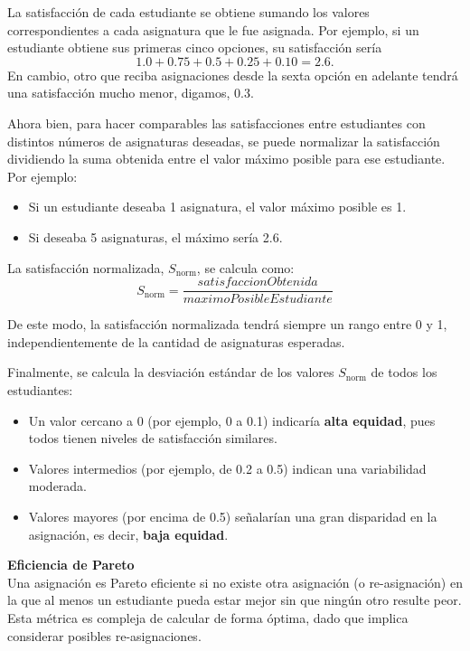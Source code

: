 \documentclass{article}
\begin{document}
La satisfacción de cada estudiante se obtiene sumando los valores correspondientes a cada 
asignatura que le fue asignada. Por ejemplo, si un estudiante obtiene sus primeras cinco opciones, 
su satisfacción sería
$$
1.0 + 0.75 + 0.5 + 0.25 + 0.10 = 2.6.
$$
En cambio, otro que reciba asignaciones desde la sexta opción en adelante tendrá una 
satisfacción mucho menor, digamos, 0.3.

Ahora bien, para hacer comparables las satisfacciones entre estudiantes con distintos números 
de asignaturas deseadas, se puede normalizar la satisfacción dividiendo la suma obtenida 
entre el valor máximo posible para ese estudiante. Por ejemplo:

\begin{itemize}
    \item Si un estudiante deseaba 1 asignatura, el valor máximo posible es 1.
    \item Si deseaba 5 asignaturas, el máximo sería 2.6.
\end{itemize}

La satisfacción normalizada, $S_{\mathrm{norm}}$, se calcula como:
$$
S_{\mathrm{norm}} = \frac{satisfaccionObtenida}{maximoPosibleEstudiante}
$$

De este modo, la satisfacción normalizada tendrá siempre un rango entre 0 y 1, independientemente de la cantidad de asignaturas esperadas.

Finalmente, se calcula la desviación estándar de los valores $S_{\mathrm{norm}}$ de todos los estudiantes:
\begin{itemize}
    \item Un valor cercano a 0 (por ejemplo, 0 a 0.1) indicaría \textbf{alta equidad}, pues todos tienen niveles de satisfacción similares.
    \item Valores intermedios (por ejemplo, de 0.2 a 0.5) indican una variabilidad moderada.
    \item Valores mayores (por encima de 0.5) señalarían una gran disparidad en la asignación, es decir, \textbf{baja equidad}.
\end{itemize}

\textbf{Eficiencia de Pareto}\\

Una asignación es Pareto eficiente si no existe otra asignación (o re-asignación) en la que 
al menos un estudiante pueda estar mejor sin que ningún otro resulte peor.
Esta métrica es compleja de calcular de forma óptima, dado que implica considerar posibles 
re-asignaciones.
\end{document}

